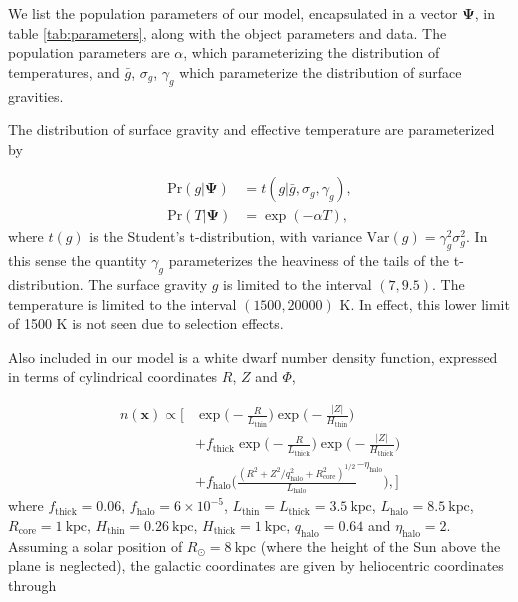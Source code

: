 \documentclass[fleqn,usenatbib]{mnras}
\newcommand{\popp}{\boldsymbol{\Psi}}
\newcommand{\Teff}{T}
\newcommand{\logg}{g}
\newcommand{\pr}{\text{Pr}}
\newcommand{\kpc}{\text{kpc}}
\begin{document}
We list the population parameters of our model, encapsulated in a vector $\popp$, in table \ref{tab:parameters}, along with the object parameters and data. The population parameters are $\alpha$, which parameterizing the distribution of temperatures, and $\bar{g}$, $\sigma_g$, $\gamma_g$ which parameterize the distribution of surface gravities.

The distribution of surface gravity and effective temperature are parameterized by

\begin{equation}\label{eq:T&g}
\begin{split}
	\pr(\logg | \popp) & = t(\logg|\bar{g},\sigma_g,\gamma_g),\\
    \pr(\Teff | \popp) & = \exp (-\alpha \Teff),
\end{split}
\end{equation}
where $t(\logg)$ is the Student's t-distribution, with variance $\text{Var}(g) = \gamma_g^2 \sigma_g^2$. In this sense the quantity $\gamma_g$ parameterizes the heaviness of the tails of the t-distribution. The surface gravity $\logg$ is limited to the interval $(7,9.5)$. The temperature is limited to the interval $(1500,20000)$ K. In effect, this lower limit of 1500 K is not seen due to selection effects.

Also included in our model is a white dwarf number density function, expressed in terms of cylindrical coordinates $R$, $Z$ and $\Phi$,

\begin{equation}\label{eq:numberdensity}
\begin{split}
	n(\mathbf{x}) \propto
	\Bigg[ 
		& \exp\Bigg(-\frac{R}{L_\text{thin}}\Bigg)\exp\Bigg(-\frac{|Z|}{H_\text{thin}}\Bigg) \\
		& +f_\text{thick}\exp\Bigg(-\frac{R}{L_\text{thick}}\Bigg)\exp\Bigg(-\frac{|Z|}{H_\text{thick}}\Bigg) \\
		& +f_\text{halo}\Bigg( \frac{(R^2+Z^2/q_\text{halo}^2+R_\text{core}^2)^{1/2}}{L_\text{halo}}^{-\eta_\text{halo}} \Bigg),
	\Bigg]
\end{split}
\end{equation}
where $f_\text{thick}=0.06$, $f_\text{halo}=6\times10^{-5}$, $L_\text{thin}=L_\text{thick}=3.5~\kpc$, $L_\text{halo}=8.5~\kpc$, $R_\text{core}=1~\kpc$, $H_\text{thin}=0.26~\kpc$, $H_\text{thick}=1~\kpc$, $q_\text{halo}=0.64$ and $\eta_\text{halo} = 2$. Assuming a solar position of $R_\odot=8~\kpc$ (where the height of the Sun above the plane is neglected), the galactic coordinates are given by heliocentric coordinates through
\end{document}
